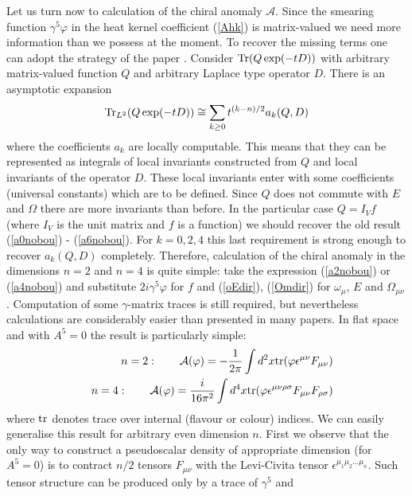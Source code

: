 Let us turn now to calculation of the chiral anomaly
$\mathcal{A}$. Since the smearing function $\gamma^5\varphi$
in the heat kernel coefficient (\ref{Ahk}) is matrix-valued
we need more information than we possess at the moment.
To recover the missing terms one can adopt the strategy of
the paper \cite{Branson:1997ze}. Consider 
${\rm Tr}(Q\exp (-tD))$ with arbitrary matrix-valued
function $Q$ and arbitrary Laplace type operator $D$.
There is an asymptotic expansion
\begin{equation}
{\rm Tr}_{L^2} (Q\exp (-tD)) 
\cong\sum_{k\ge0}t^{(k-n)/2}a_k(Q,D)
\label{Qasymptotex}
\end{equation}
where the coefficients $a_k$ are locally computable. This
means that they can be represented as integrals of local
invariants constructed from $Q$ and local invariants
of the operator $D$. These local invariants enter with
some coefficients (universal constants) which are to be
defined. Since $Q$ does not commute with $E$ and $\Omega$
there are more invariants than before. In the particular
case $Q=I_Vf$ (where $I_V$ is the unit matrix and $f$
is a function) we should recover the old result
(\ref{a0nobou}) - (\ref{a6nobou}). For $k=0,2,4$ this
last requirement is strong enough to recover 
$a_k(Q,D)$ completely. Therefore, calculation of the chiral
anomaly in the dimensions $n=2$ and $n=4$ is quite simple:
take the expression (\ref{a2nobou}) or (\ref{a4nobou})
and substitute $2i\gamma^5\varphi$ for $f$ and
(\ref{oEdir}), (\ref{Omdir}) for $\omega_\mu$, $E$
and $\Omega_{\mu\nu}$. Computation of some $\gamma$-matrix
traces is still required, but nevertheless calculations 
are considerably easier than presented in many papers.
In flat space and with
$A^5=0$ the result is particularly simple:
\begin{eqnarray}
&&n=2:\qquad \mathcal{A}(\varphi )= -\frac 1{2\pi}
\int d^2x {\rm tr}(\varphi \epsilon^{\mu\nu}F_{\mu\nu}) 
\label{Am2} \\
&&n=4:\qquad \mathcal{A}(\varphi )= \frac i{16\pi^2}
\int d^4x {\rm tr}(\varphi \epsilon^{\mu\nu\rho\sigma}
F_{\mu\nu}F_{\rho\sigma} )
\label{Am4}
\end{eqnarray}
where ${\rm tr}$ denotes trace over internal (flavour
or colour) indices. We can easily generalise this result
for arbitrary even dimension $n$. First we observe that
the only way to construct a pseudoscalar density of
appropriate dimension (for $A^5=0$) is to contract
$n/2$ tensors $F_{\mu\nu}$ with the Levi-Civita
tensor $\epsilon^{\mu_1\mu_2\dots\mu_n}$. Such tensor
structure can be produced only by a trace of $\gamma^5$ and
